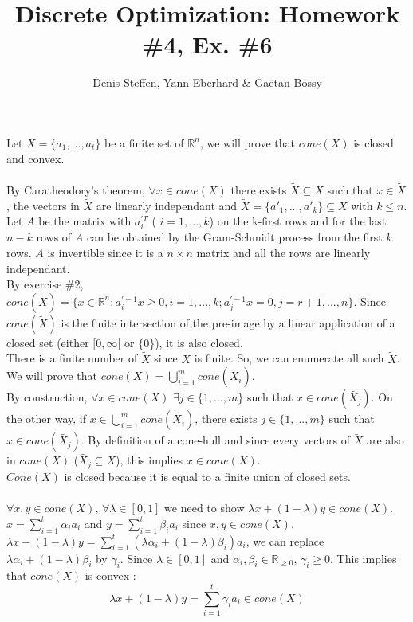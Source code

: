 \documentclass[a4paper,11pt,french]{article}
\title{Discrete Optimization: Homework \#4, Ex. \#6}
\author{Denis Steffen, Yann Eberhard \& Gaëtan Bossy}
\begin{document}
\maketitle
Let $X=\{ a_{1}, ... , a_{t}\}$ be a finite set of $\mathbb{R}^{n}$, we will prove that $cone(X)$ is closed and convex.
\\
\\
By Caratheodory's theorem, $\forall x \in cone(X)$ there exists $\widetilde{X} \subseteq X$ such that $x \in \widetilde{X}$, the vectors in $\widetilde{X}$ are linearly independant and $\widetilde{X}=\{ a'_{1}, ... , a'_{k} \} \subseteq X$ with $k\leq n$. Let $A$ be the matrix with $a_{i}^{\prime T}$ ( $i=1, ... , k$) on the k-first rows and for the last $n-k$ rows of $A$ can be obtained by the Gram-Schmidt process from the first $k$ rows. $A$ is invertible since it is a $n \times n$ matrix and all the rows are linearly independant.
\\
By exercise \#2, $cone(\widetilde{X})=\{ x\in \mathbb{R}^{n} : a_{ i}^{\prime -1}x \geq 0, i=1, ... , k; a_{j}^{\prime -1}x = 0, j=r+1, ... , n  \}$.
Since $cone(\widetilde{X})$ is the finite intersection of the pre-image by a linear application of a closed set (either $[0, \infty[$ or $\{0\}$), it is also closed. 
\\
There is a finite number of $\widetilde{X}$ since $X$ is finite. So, we can enumerate all such $\widetilde{X}$. We will prove that $cone(X)=\displaystyle{\bigcup_{ i=1}^{m}} cone(\widetilde{X_{i}})$. 
\\
By construction, $\forall x \in cone(X)$ $\exists j \in \{1, ..., m\}$ such that $x \in cone(\widetilde{X_{j}})$. On the other way, if $x \in \displaystyle{\bigcup_{ i=1}^{m}} cone(\widetilde{X_{i}})$, there exists $j \in \{1, ... , m \}$ such that $x \in cone(\widetilde{X_{j}})$. 
By definition of a cone-hull and since every vectors of $\widetilde{X}$ are also in $cone(X)$ ($\widetilde{X_{j}} \subseteq X$), this implies $x \in cone(X)$.
\\
$Cone(X)$ is closed because it is equal to a finite union of closed sets.
\\
\\
$\forall x, y \in cone(X)$, $\forall \lambda \in [0,1]$ we need to show $\lambda 
x +(1-\lambda)y \in cone(X)$. $x=\displaystyle{\sum_{i=1}^{t}} \alpha_{i} a_{i}$ and $y=\displaystyle{\sum_{i=1}^{t}} \beta_{i} a_{i}$ since $x,y \in cone(X)$.
\\
$\lambda x +(1-\lambda)y = \displaystyle{\sum_{i=1}^{t}} (\lambda \alpha_{i} + (1-\lambda)\beta_{i}) a_{i}$, we can replace $\lambda \alpha_{i} + (1-\lambda)\beta_{i}$ by $\gamma_{i}$. Since $\lambda \in [0,1]$ and $\alpha_{i}, \beta_{i} \in \mathbb{R}_{\geq 0}$, $\gamma_{i} \geq 0$. This implies that $cone(X)$ is convex :
\begin{equation*}
\lambda x +(1-\lambda)y = \displaystyle{\sum_{i=1}^{t}} \gamma_{i} a_{i} \in cone(X)
\end{equation*}
\end{document}

